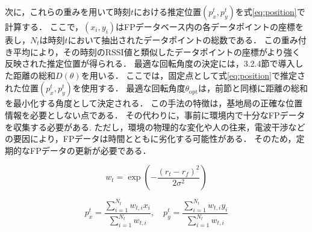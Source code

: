 次に，これらの重みを用いて時刻$t$における推定位置$(p_x^t, p_y^t)$を式\eqref{eq:position}で計算する．
ここで，$(x_i, y_i)$はFPデータベース内の各データポイントの座標を表し，$
N_t$は時刻$t$において抽出されたデータポイントの総数である．
この重み付き平均により，その時刻のRSSI値と類似したデータポイントの座標がより強く反映された推定位置が得られる．
最適な回転角度の決定には，3.2.4節で導入した距離の総和$D(\theta)$を用いる．
ここでは，固定点として式\eqref{eq:position}で推定された位置$(p_x^t, p_y^t)$を使用する．
最適な回転角度$\theta_{\mathrm{opt}}$は，前節と同様に距離の総和を最小化する角度として決定される．
この手法の特徴は，基地局の正確な位置情報を必要としない点である．
その代わりに，事前に環境内で十分なFPデータを収集する必要がある.
ただし，環境の物理的な変化や人の往来，電波干渉などの要因により，FPデータは時間とともに劣化する可能性がある．
そのため，定期的なFPデータの更新が必要である．

\begin{equation}
\label{eq:weight}
w_t = \exp\left(-\frac{(r_t - r_f)^2}{2\sigma^2}\right)
\end{equation}

\begin{equation}
\label{eq:position}
p_x^t = \frac{\sum_{i=1}^{N_t} w_{t,i} x_i}{\sum_{i=1}^{N_t} w_{t,i}}, \quad
p_y^t = \frac{\sum_{i=1}^{N_t} w_{t,i} y_i}{\sum_{i=1}^{N_t} w_{t,i}}
\end{equation}












